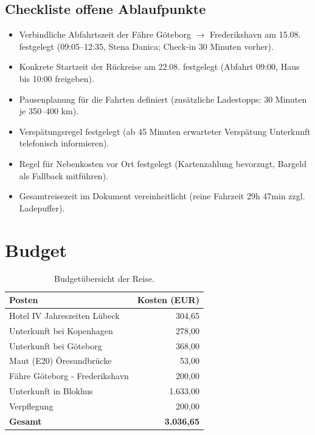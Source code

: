 \documentclass[a4paper,12pt]{article}
\begin{document}
\subsection*{Checkliste offene Ablaufpunkte}
\begin{itemize}
\item [x] Verbindliche Abfahrtszeit der Fähre Göteborg $\rightarrow$ Frederikshavn am 15.08. festgelegt (09:05--12:35, Stena Danica; Check-in 30 Minuten vorher).
\item [x] Konkrete Startzeit der Rückreise am 22.08. festgelegt (Abfahrt 09:00, Haus bis 10:00 freigeben).
\item [x] Pausenplanung für die Fahrten definiert (zusätzliche Ladestopps: 30 Minuten je 350--400 km).
\item [x] Verspätungsregel festgelegt (ab 45 Minuten erwarteter Verspätung Unterkunft telefonisch informieren).
\item [x] Regel für Nebenkosten vor Ort festgelegt (Kartenzahlung bevorzugt, Bargeld als Fallback mitführen).
\item [x] Gesamtreisezeit im Dokument vereinheitlicht (reine Fahrzeit 29h 47min zzgl. Ladepuffer).
\end{itemize}

\section{Budget}
\begin{table}[H] %
\centering
\begin{tabular}{|l|r|}
\hline
\textbf{Posten} & \textbf{Kosten (EUR)} \\
\hline
Hotel IV Jahreszeiten Lübeck & 304,65  \\
Unterkunft bei Kopenhagen & 278,00 \\
Unterkunft bei Göteborg & 368,00 \\
Maut (E20) Öresundbrücke & 53,00  \\
Fähre Göteborg - Frederikshavn & 200,00 \\
Unterkunft in Blokhus & 1.633,00  \\
Verpflegung & 200,00 \\
\hline
\textbf{Gesamt} & \textbf{3.036,65} \\
\hline
\end{tabular}
\caption{Budgetübersicht der Reise.}
\label{tab:Budget}
\end{table}

\end{document}
